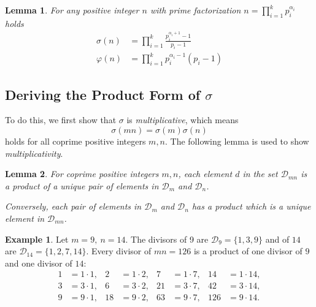 \documentclass[a4paper, 12pt]{article}
\newtheorem{lemma}{Lemma}
\theoremstyle{definition}
\newtheorem{example}{Example}
\begin{document}
\vspace{1em}\begin{lemma}\label{lemma:prod_form}
  For any positive integer $n$ with prime factorization $n = \prod_{i=1}^{k} p_i^{\alpha_i}$ holds
  \begin{align}
    \sigma(n)  &= \prod_{i=1}^{k} \frac{p_i^{\alpha_i+1}-1}{p_i-1} \label{eq:prod_sigma}\\
    \varphi(n) &= \prod_{i=1}^{k} p_i^{\alpha_i-1}(p_i-1) \label{eq:prod_totient}
  \end{align}
\end{lemma}\vspace{1em}

\subsection{Deriving the Product Form of $\sigma$}
To do this, we first show that $\sigma$ is \textit{multiplicative}, which means
\begin{equation}
  \sigma(mn)=\sigma(m)\sigma(n)
\end{equation}
holds for all coprime positive integers $m, n$.
The following lemma is used to show \textit{multiplicativity}.

\vspace{1em}\begin{lemma}\label{lemma:sigmal1}
  For coprime positive integers $m, n$,
  each element $d$ in the set $\mathcal{D}_{mn}$ is a product of a
  unique pair of elements in $\mathcal{D}_m$ and $\mathcal{D}_n$.

  Conversely, each pair of elements in $\mathcal{D}_m$ and $\mathcal{D}_n$
  has a product which is a unique element in $\mathcal{D}_{mn}$.
\end{lemma}
\vspace{1em}
\begin{example}
  Let $m=9,\ n=14$.
  The divisors of 9 are $\mathcal{D}_9=\{1, 3, 9\}$ and of $14$ are
  $\mathcal{D}_{14}=\{1, 2, 7, 14\}$.
  Every divisor of $mn=126$ is a product of one divisor
  of $9$ and one divisor of $14$:
  \[
  \begin{aligned}
    1  &= 1\cdot1,  & 2  &= 1\cdot2,  & 7  &= 1\cdot7,  & 14  &= 1\cdot14,\\
    3  &= 3\cdot1,  & 6  &= 3\cdot2,  & 21 &= 3\cdot7,  & 42  &= 3\cdot14,\\
    9  &= 9\cdot1,  & 18 &= 9\cdot2,  & 63 &= 9\cdot7,  & 126 &= 9\cdot14.
  \end{aligned}
  \]
\end{example}\vspace{1em}
\end{document}
